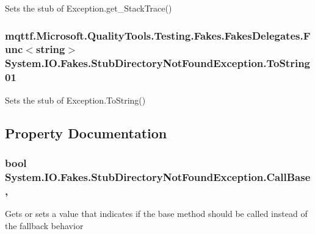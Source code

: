 Sets the stub of Exception.\-get\-\_\-\-Stack\-Trace()

\hypertarget{class_system_1_1_i_o_1_1_fakes_1_1_stub_directory_not_found_exception_adb3c9394995b1ee544c04d43cbb3dde1}{
\subsubsection[{To\-String01}]{\setlength{\rightskip}{0pt plus 5cm}mqttf.\-Microsoft.\-Quality\-Tools.\-Testing.\-Fakes.\-Fakes\-Delegates.\-Func$<$string$>$ System.\-I\-O.\-Fakes.\-Stub\-Directory\-Not\-Found\-Exception.\-To\-String01}}\label{class_system_1_1_i_o_1_1_fakes_1_1_stub_directory_not_found_exception_adb3c9394995b1ee544c04d43cbb3dde1}


Sets the stub of Exception.\-To\-String()



\subsection{Property Documentation}
\hypertarget{class_system_1_1_i_o_1_1_fakes_1_1_stub_directory_not_found_exception_a1bbeea7dc3c925b39e5b36b543ed21a7}{
\subsubsection[{Call\-Base}]{\setlength{\rightskip}{0pt plus 5cm}bool System.\-I\-O.\-Fakes.\-Stub\-Directory\-Not\-Found\-Exception.\-Call\-Base\hspace{0.3cm}{\ttfamily [get]}, {\ttfamily [set]}}}\label{class_system_1_1_i_o_1_1_fakes_1_1_stub_directory_not_found_exception_a1bbeea7dc3c925b39e5b36b543ed21a7}


Gets or sets a value that indicates if the base method should be called instead of the fallback behavior

